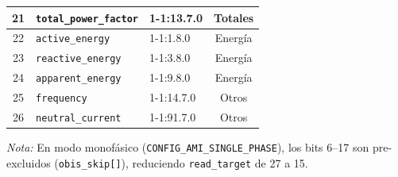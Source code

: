 \begin{table}[htbp]
\begin{tabular}{c l l c}
21 & \texttt{total\_power\_factor}   & 1-1:13.7.0  & Totales \\
\midrule
22 & \texttt{active\_energy}    & 1-1:1.8.0   & Energía \\
23 & \texttt{reactive\_energy}  & 1-1:3.8.0   & Energía \\
24 & \texttt{apparent\_energy}  & 1-1:9.8.0   & Energía \\
\midrule
25 & \texttt{frequency}         & 1-1:14.7.0  & Otros \\
26 & \texttt{neutral\_current}  & 1-1:91.7.0  & Otros \\
\bottomrule
\end{tabular}

\smallskip
\footnotesize
\textit{Nota:} En modo monofásico (\texttt{CONFIG\_AMI\_SINGLE\_PHASE}), los bits 6--17
son pre-excluidos (\texttt{obis\_skip[]}), reduciendo \texttt{read\_target} de 27 a 15.
\end{table}
